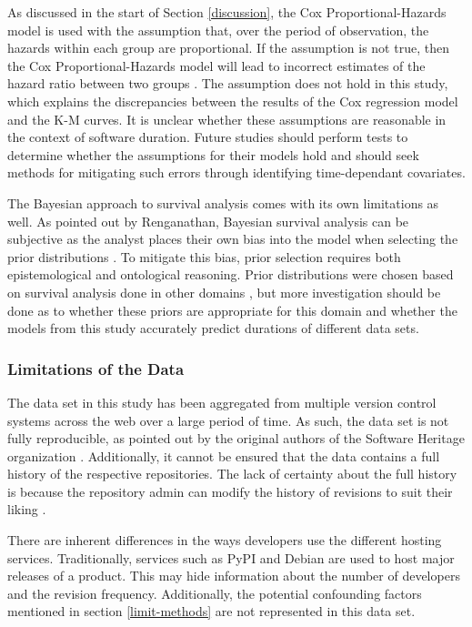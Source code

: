 \documentclass[sigconf,review]{acmart}
\begin{document}
As discussed in the start of Section \ref{discussion}, the Cox Proportional-Hazards model is used with the assumption that, over the period of observation, the hazards within each group are proportional.
If the assumption is not true, then the Cox Proportional-Hazards model will lead to incorrect estimates of the hazard ratio between two groups \cite{stel2011cox}.
The assumption does not hold in this study, which explains the discrepancies between the results of the Cox regression model and the K-M curves.
It is unclear whether these assumptions are reasonable in the context of software duration.
Future studies should perform tests to determine whether the assumptions for their models hold and should seek methods for mitigating such errors through identifying time-dependant covariates.

The Bayesian approach to survival analysis comes with its own limitations as well.
As pointed out by Renganathan, Bayesian survival analysis can be subjective as the analyst places their own bias into the model when selecting the prior distributions \cite{renganathan2016overview}.
To mitigate this bias, prior selection requires both epistemological and ontological reasoning.
Prior distributions were chosen based on survival analysis done in other domains \cite{kelter2020bayesian, rethinking}, but more investigation should be done as to whether these priors are appropriate for this domain and whether the models from this study accurately predict durations of different data sets.

\subsubsection{Limitations of the Data}

The data set in this study has been aggregated from multiple version control systems across the web over a large period of time.
As such, the data set is not fully reproducible, as pointed out by the original authors of the Software Heritage organization \cite{pietri2019software}.
Additionally, it cannot be ensured that the data contains a full history of the respective repositories.
The lack of certainty about the full history is because the repository admin can modify the history of revisions to suit their liking \cite{perils2009}.

There are inherent differences in the ways developers use the different hosting services.
Traditionally, services such as PyPI and Debian are used to host major releases of a product.
This may hide information about the number of developers and the revision frequency.
Additionally, the potential confounding factors mentioned in section \ref{limit-methods} are not represented in this data set.
\end{document}

